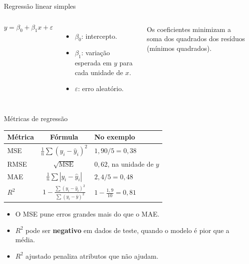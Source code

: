 \documentclass[10pt]{beamer}
\begin{document}
\begin{frame}{Regressão linear simples}
\begin{columns}[c]
\[ y=\beta_0+\beta_1x+\varepsilon \]
\begin{itemize}
 \item $\beta_0$: intercepto.
 \item $\beta_1$: variação esperada em $y$ para cada unidade de $x$.
 \item $\varepsilon$: erro aleatório.
\end{itemize}
Os coeficientes minimizam a soma dos quadrados dos resíduos (mínimos quadrados).
\end{columns}
\end{frame}


\begin{frame}{Métricas de regressão}
\small
\begin{tabularx}{\textwidth}{@{}l c X@{}}
\toprule
\textbf{Métrica} & \textbf{Fórmula} & \textbf{No exemplo} \\
\midrule
MSE & $\frac{1}{n}\sum(y_i-\hat{y}_i)^2$ & $1{,}90/5=0{,}38$ \\
RMSE & $\sqrt{\text{MSE}}$ & $0{,}62$, na unidade de $y$ \\
MAE & $\frac{1}{n}\sum|y_i-\hat{y}_i|$ & $2{,}4/5=0{,}48$ \\
$R^2$ & $1-\frac{\sum(y_i-\hat{y}_i)^2}{\sum(y_i-\bar{y})^2}$ & $1-\frac{1{,}9}{10}=0{,}81$ \\
\bottomrule
\end{tabularx}

\vspace{2mm}
\begin{itemize}\small
 \item O MSE pune erros grandes mais do que o MAE.
 \item $R^2$ pode ser \textbf{negativo} em dados de teste, quando o modelo é pior que a média.
 \item $R^2$ ajustado penaliza atributos que não ajudam.
\end{itemize}
\end{frame}
\end{document}
